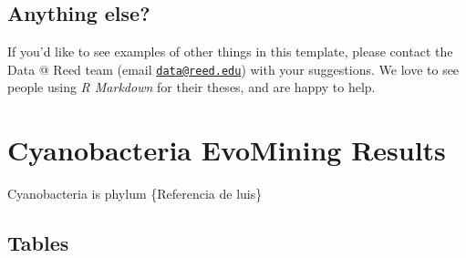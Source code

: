 \documentclass[12pt,twoside]{reedthesis}
\begin{document}
  \section{Anything else?}\label{anything-else-1}
  
  If you'd like to see examples of other things in this template, please
  contact the Data @ Reed team (email
  \href{mailto:data@reed.edu}{\nolinkurl{data@reed.edu}}) with your
  suggestions. We love to see people using \emph{R Markdown} for their
  theses, and are happy to help.
  
  \hypertarget{ref_labels}{\chapter{Cyanobacteria EvoMining
  Results}\label{ref_labels}}
  
  Cyanobacteria is phylum \{Referencia de luis\}
  
  \section{Tables}\label{tables-2}
  
\end{document}
